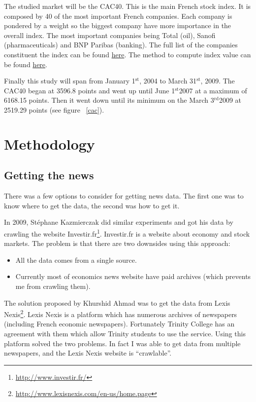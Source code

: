 \documentclass[12pt]{report}
\newcommand{\superscript}[1]{\ensuremath{^{\textrm{#1}}}}
\newcommand{\st}[0]{\superscript{st}}
\newcommand{\rd}[0]{\superscript{rd}}
\begin{document}
The studied market will be the CAC40. This is the main French stock index. It is composed by 40 of the most important French companies. Each company is pondered by a weight so the biggest company have more importance in the overall index. The most important companies being Total (oil), Sanofi (pharmaceuticals) and BNP Paribas (banking). The full list of the companies constituent the index can be found \href{http://en.wikipedia.org/wiki/CAC40}{here}. The method to compute index value can be found \href{http://www.euronext.com/fic/000/050/871/508718.pdf}{here}.

Finally this study will span from January 1\st, 2004 to March 31\st, 2009. The CAC40 began at 3596.8 points and went up until June 1\st 2007 at a maximum of 6168.15 points. Then it went down until its minimum on the March 3\rd 2009 at 2519.29 points (see figure ~\ref{cac}).

\chapter{Methodology}
\section{Getting the news}

There was a few options to consider for getting news data. The first one was to know where to get the data, the second was how to get it.

In 2009, Stéphane Kazmierczak \cite{kazmierczak08} did similar experiments and got his data by crawling the website Investir.fr\footnote{\url{http://www.investir.fr/}}. Investir.fr is a website about economy and stock markets. The problem is that there are two downsides using this approach:
\begin{itemize}
	\item All the data comes from a single source.
	\item Currently most of economics news website have paid archives (which prevents me from crawling them).
\end{itemize}

The solution proposed by Khurshid Ahmad was to get the data from Lexis Nexis\footnote{\url{http://www.lexisnexis.com/en-us/home.page}}. Lexis Nexis is a platform which has numerous archives of newspapers (including French economic newspapers). Fortunately Trinity College has an agreement with them which allow Trinity students to use the service. Using this platform solved the two problems. In fact I was able to get data from multiple newspapers, and the Lexis Nexis website is ``crawlable''.
\end{document}

